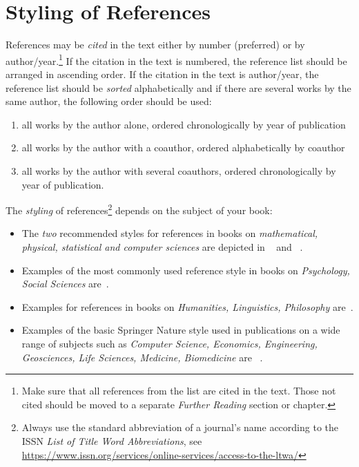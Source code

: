 %
%
% 
% 
%
\section{Styling of References}
References may be \textit{cited} in the text either by number (preferred) or by author/year.\footnote{Make sure that all references from the list are cited in the text. Those not cited should be moved to a separate \textit{Further Reading} section or chapter.} If the citation in the text is numbered, the reference list should be arranged in ascending order. If the citation in the text is author/year, the reference list should be \textit{sorted} alphabetically and if there are several works by the same author, the following order should be used:
\begin{enumerate}
\item all works by the author alone, ordered chronologically by year of publication
\item all works by the author with a coauthor, ordered alphabetically by coauthor
\item all works by the author with several coauthors, ordered chronologically by year of publication.
\end{enumerate}
The \textit{styling} of references\footnote{Always use the standard abbreviation of a journal's name according to the ISSN \textit{List of Title Word Abbreviations}, see \url{https://www.issn.org/services/online-services/access-to-the-ltwa/}} depends on the subject of your book:
\begin{itemize}
\item The \textit{two} recommended styles for references in books on \textit{mathematical, physical, statistical and computer sciences} are depicted in ~\cite{science-contrib, science-online, science-mono, science-journal, science-DOI} and ~\cite{phys-online, phys-mono, phys-journal, phys-DOI, phys-contrib}.
\item Examples of the most commonly used reference style in books on \textit{Psychology, Social Sciences} are~\cite{psysoc-mono, psysoc-online,psysoc-journal, psysoc-contrib, psysoc-DOI}.
\item Examples for references in books on \textit{Humanities, Linguistics, Philosophy} are~\cite{humlinphil-journal, humlinphil-contrib, humlinphil-mono, humlinphil-online, humlinphil-DOI}.
\item Examples of the basic Springer Nature style used in publications on a wide range of subjects such as \textit{Computer Science, Economics, Engineering, Geosciences, Life Sciences, Medicine, Biomedicine} are ~\cite{basic-contrib, basic-online, basic-journal, basic-DOI, basic-mono}. 
\end{itemize}


